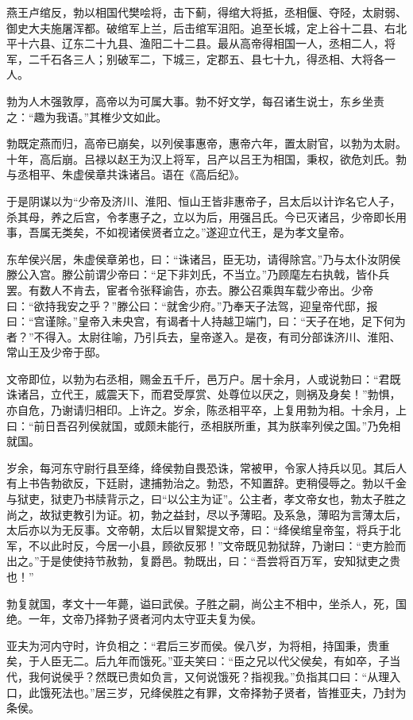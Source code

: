 \documentclass[]{article}
\begin{document}
燕王卢绾反，勃以相国代樊哙将，击下蓟，得绾大将抵，丞相偃、夺陉，太尉弱、御史大夫施屠浑都。破绾军上兰，后击绾军沮阳。追至长城，定上谷十二县、右北平十六县、辽东二十九县、渔阳二十二县。最从高帝得相国一人，丞相二人，将军，二千石各三人；别破军二，下城三，定郡五、县七十九，得丞相、大将各一人。

勃为人木强敦厚，高帝以为可属大事。勃不好文学，每召诸生说士，东乡坐责之：``趣为我语。''其椎少文如此。

勃既定燕而归，高帝已崩矣，以列侯事惠帝，惠帝六年，置太尉官，以勃为太尉。十年，高后崩。吕禄以赵王为汉上将军，吕产以吕王为相国，秉权，欲危刘氏。勃与丞相平、朱虚侯章共诛诸吕。语在《高后纪》。

于是阴谋以为``少帝及济川、淮阳、恒山王皆非惠帝子，吕太后以计诈名它人子，杀其母，养之后宫，令孝惠子之，立以为后，用强吕氏。今已灭诸吕，少帝即长用事，吾属无类矣，不如视诸侯贤者立之。''遂迎立代王，是为孝文皇帝。

东牟侯兴居，朱虚侯章弟也，曰：``诛诸吕，臣无功，请得除宫。''乃与太仆汝阴侯滕公入宫。滕公前谓少帝曰：``足下非刘氏，不当立。''乃顾麾左右执戟，皆仆兵罢。有数人不肯去，宦者令张释谕告，亦去。滕公召乘舆车载少帝出。少帝曰：``欲持我安之乎？''滕公曰：``就舍少府。''乃奉天子法驾，迎皇帝代邸，报曰：``宫谨除。''皇帝入未央宫，有谒者十人持越卫端门，曰：``天子在地，足下何为者？''不得入。太尉往喻，乃引兵去，皇帝遂入。是夜，有司分部诛济川、淮阳、常山王及少帝于邸。

文帝即位，以勃为右丞相，赐金五千斤，邑万户。居十余月，人或说勃曰：``君既诛诸吕，立代王，威震天下，而君受厚赏、处尊位以厌之，则祸及身矣！''勃惧，亦自危，乃谢请归相印。上许之。岁余，陈丞相平卒，上复用勃为相。十余月，上曰：``前日吾召列侯就国，或颇未能行，丞相朕所重，其为朕率列侯之国。''乃免相就国。

岁余，每河东守尉行县至绛，绛侯勃自畏恐诛，常被甲，令家人持兵以见。其后人有上书告勃欲反，下廷尉，逮捕勃治之。勃恐，不知置辞。吏稍侵辱之。勃以千金与狱吏，狱吏乃书牍背示之，曰``以公主为证''。公主者，孝文帝女也，勃太子胜之尚之，故狱吏教引为证。初，勃之益封，尽以予薄昭。及系急，薄昭为言薄太后，太后亦以为无反事。文帝朝，太后以冒絮提文帝，曰：``绛侯绾皇帝玺，将兵于北军，不以此时反，今居一小县，顾欲反邪！''文帝既见勃狱辞，乃谢曰：``吏方脸而出之。''于是使使持节赦勃，复爵邑。勃既出，曰：``吾尝将百万军，安知狱吏之贵也！''

勃复就国，孝文十一年薨，谥曰武侯。子胜之嗣，尚公主不相中，坐杀人，死，国绝。一年，文帝乃择勃子贤者河内太守亚夫复为侯。

亚夫为河内守时，许负相之：``君后三岁而侯。侯八岁，为将相，持国秉，贵重矣，于人臣无二。后九年而饿死。''亚夫笑曰：``臣之兄以代父侯矣，有如卒，子当代，我何说侯乎？然既已贵如负言，又何说饿死？指视我。''负指其口曰：``从理入口，此饿死法也。''居三岁，兄绛侯胜之有罪，文帝择勃子贤者，皆推亚夫，乃封为条侯。
\end{document}
